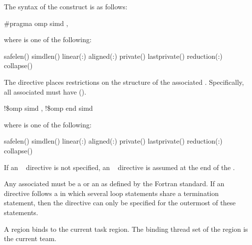 \syntax
The syntax of the  construct is as follows:

\ccppspecificstart
\begin{boxedcode}
\#pragma omp simd \plc{[clause[ [},\plc{] clause] ... ] new-line}
\end{boxedcode}

where  is one of the following:

\begin{indentedcodelist}
safelen()
simdlen()
linear(\plc{list[ }:\plc{ linear-step]})
aligned(\plc{list[ }:\plc{ alignment]})
private()
lastprivate()
reduction(:)
collapse()
\end{indentedcodelist}

The  directive places restrictions on the structure of the associated . 
Specifically, all associated  must have  
().
\ccppspecificend

\fortranspecificstart
\begin{boxedcode}
!\$omp simd \plc{[clause[ [},\plc{] clause ... ]}
\plc{[}!\$omp end simd\plc{]}
\end{boxedcode}

where  is one of the following:

\begin{indentedcodelist}
safelen()
simdlen()
linear(\plc{list[ }:\plc{ linear-step]})
aligned(\plc{list[ }:\plc{ alignment]})
private()
lastprivate()
reduction(:)
collapse()
\end{indentedcodelist}

If an ~ directive is not specified, an ~ directive is assumed at the end 
of the .

Any associated  must be a  or an 
 as defined by the Fortran standard. If an 
~ directive follows a  in which 
several loop statements share a  termination statement, then the 
directive can only be specified for the outermost of these 
 statements. 
\fortranspecificend

\binding
A  region binds to the current task region. The binding thread set of the  
region is the current team.

